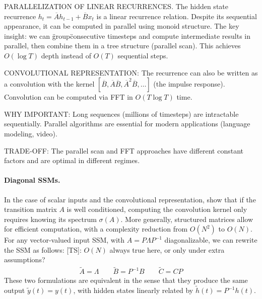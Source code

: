 \documentclass{article}
\newcommand{\TS}[1]{{\color{pink}[TS]: #1}}
\begin{document}
\begin{thomasbox}
PARALLELIZATION OF LINEAR RECURRENCES. The hidden state recurrence $h_t = \overline{A} h_{t-1} + \overline{B} x_t$ is a linear recurrence relation. Despite its sequential appearance, it can be computed in parallel using monoid structure. The key insight: we can \"group\" consecutive timesteps and compute intermediate results in parallel, then combine them in a tree structure (parallel scan). This achieves $O(\log T)$ depth instead of $O(T)$ sequential steps.

CONVOLUTIONAL REPRESENTATION: The recurrence can also be written as a convolution with the kernel $[\overline{B}, \overline{A}\overline{B}, \overline{A}^2\overline{B}, \ldots]$ (the impulse response). Convolution can be computed via FFT in $O(T \log T)$ time.

WHY IMPORTANT: Long sequences (millions of timesteps) are intractable sequentially. Parallel algorithms are essential for modern applications (language modeling, video).

TRADE-OFF: The parallel scan and FFT approaches have different constant factors and are optimal in different regimes.
\end{thomasbox}

\paragraph{Diagonal SSMs.} In the case of scalar inputs and the convolutional representation, \citet{gu2022diagonal} show that if the transition matrix $A$ is well conditioned, computing the convolution kernel only requires knowing its spectrum $\sigma(A)$. More generally, structured matrices allow for efficient computation, with a complexity reduction from $O(N^2)$ to $O(N)$. For any vector-valued input SSM, with $A = P \Lambda P^{-1}$ diagonalizable, we can rewrite the SSM as follows:
\TS{$O(N)$ always true here, or only under extra assumptions?}
%
\begin{align}
\label{eq:ssm:diagonal}
\widetilde{A} = \Lambda \qquad \widetilde{B} = P^{-1} B \qquad \widetilde{C} = C P
\end{align}
These two formulations are equivalent in the sense that they produce the same output $\widetilde{y}(t)=y(t)$, with hidden states linearly related by $\widetilde{h}(t) = P^{-1} h(t)$.
\end{document}
